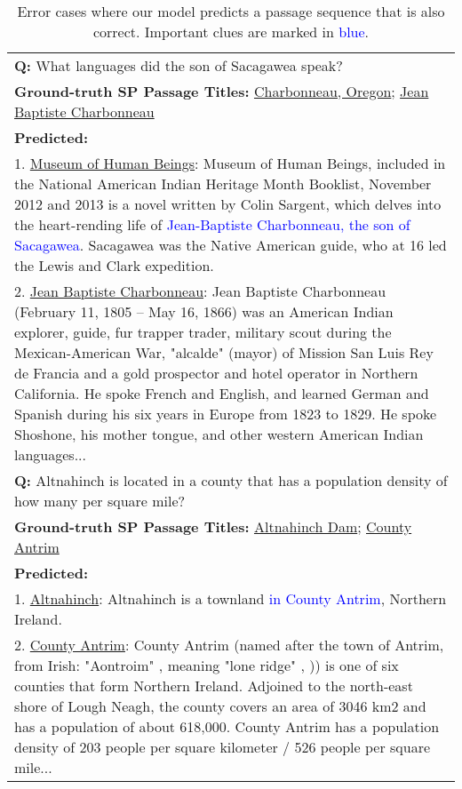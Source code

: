 \begin{table*}[h]
    \centering
    \caption{Error cases where our model predicts a passage sequence that is also correct. Important clues are marked in \textcolor{blue}{blue}.}
    \begin{tabular}{p{}}
    \toprule
    \textbf{Q:} What languages did the son of Sacagawea speak? \\
    \textbf{Ground-truth SP Passage Titles:}  \underline{Charbonneau, Oregon}; \underline{Jean Baptiste Charbonneau}\\
    \textbf{Predicted:} \\
    1. \underline{Museum of Human Beings}: Museum of Human Beings, included in the National American Indian Heritage Month Booklist, November 2012 and 2013 is a novel written by Colin Sargent, which delves into the heart-rending life of \textcolor{blue}{Jean-Baptiste Charbonneau, the son of Sacagawea}. Sacagawea was the Native American guide, who at 16 led the Lewis and Clark expedition. \\
    2. \underline{Jean Baptiste Charbonneau}: Jean Baptiste Charbonneau (February 11, 1805 – May 16, 1866) was an American Indian explorer, guide, fur trapper trader, military scout during the Mexican-American War, "alcalde" (mayor) of Mission San Luis Rey de Francia and a gold prospector and hotel operator in Northern California. He spoke French and English, and learned German and Spanish during his six years in Europe from 1823 to 1829. He spoke Shoshone, his mother tongue, and other western American Indian languages...\\
    \midrule
    \textbf{Q:} Altnahinch is located in a county that has a population density of how many per square mile? \\
    \textbf{Ground-truth SP Passage Titles:} \underline{Altnahinch Dam}; \underline{County Antrim}\\
    \textbf{Predicted:}\\
    1. \underline{Altnahinch}: Altnahinch is a townland \textcolor{blue}{in County Antrim}, Northern Ireland.\\
    2. \underline{County Antrim}: County Antrim (named after the town of Antrim, from Irish: "Aontroim" , meaning "lone ridge" , )) is one of six counties that form Northern Ireland. Adjoined to the north-east shore of Lough Neagh, the county covers an area of 3046 km2 and has a population of about 618,000. County Antrim has a population density of 203 people per square kilometer / 526 people per square mile...\\

\end{tabular}
\end{table*}
